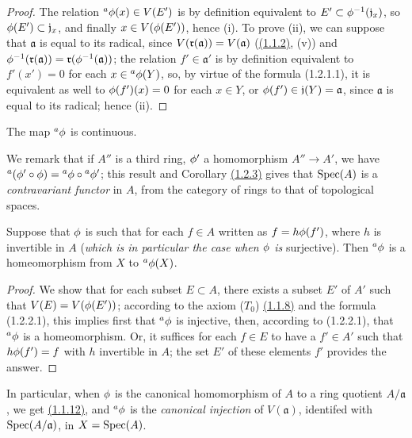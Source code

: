 \begin{proof}
\label{proof-prop-1.1.2.2}
The relation ${}^a\phi(x)\in V(E')$ is by definition equivalent to
$E'\subset\phi^{-1}(\mathfrak{j}_x)$, so $\phi(E')\subset\mathfrak{j}_x$, and
finally $x\in V(\phi(E'))$, hence (i). To prove (ii), we can suppose that
$\mathfrak{a}$ is equal to its radical, since $V(\mathfrak{r}(\mathfrak{a}))=V(\mathfrak{a})$
(\hyperref[prop-1.1.1.2]{(1.1.2)}, (v)) and
$\phi^{-1}(\mathfrak{r}(\mathfrak{a}))=\mathfrak{r}(\phi^{-1}(\mathfrak{a}))$; the relation
$f'\in\mathfrak{a}'$ is by definition equivalent to $f'(x')=0$ for each
$x\in{{}^a\phi(Y)}$, so, by virtue of the formula (1.2.1.1), it is equivalent as well
to $\phi(f')(x)=0$ for each $x\in Y$, or $\phi(f')\in\mathfrak{j}(Y)=\mathfrak{a}$,
since $\mathfrak{a}$ is equal to its radical; hence (ii).
\end{proof}

\begin{cor}[1.2.3]
\label{cor-1.1.2.3}
The map ${}^a\phi$ is continuous.
\end{cor}

We remark that if $A''$ is a third ring, $\phi'$ a homomorphism $A''\to A'$, we have
${}^a(\phi'\circ\phi)={}^a\phi\circ{}^a\phi'$; this result and Corollary
\hyperref[cor-1.1.2.3]{(1.2.3)} gives that ${\mathop{\mathrm{Spec}}\nolimits}(A)$ is a {\em contravariant functor} in $A$, from the
category of rings to that of topological spaces.

\begin{cor}[1.2.4]
\label{cor-1.1.2.4}
Suppose that $\phi$ is such that for each $f\in A$ written as $f=h\phi(f')$, where $h$ is
invertible in $A$ ({\em which is in particular the case when $\phi$ is} surjective). Then
${}^a\phi$ is a homeomorphism from $X$ to ${}^a\phi(X)$.
\end{cor}

\begin{proof}
\label{proof-cor-1.1.2.4}
We show that for each subset $E\subset A$, there exists a subset $E'$ of $A'$ such that
$V(E)=V(\phi(E'))$; according to the axiom ($T_0$) \hyperref[cor-1.1.1.8]{(1.1.8)} and the formula
(1.2.2.1), this implies first that ${}^a\phi$ is injective, then, according to (1.2.2.1),
that ${}^a\phi$ is a homeomorphism. Or, it suffices for each $f\in E$ to have a $f'\in A'$
such that $h\phi(f')=f$ with $h$ invertible in $A$; the set $E'$ of these elements $f'$
provides the answer.
\end{proof}

\begin{env}[1.2.5]
\label{env-1.1.2.5}
In particular, when $\phi$ is the canonical homomorphism of $A$ to a ring quotient
$A/\mathfrak{a}$, we get \hyperref[cor-1.1.1.12]{(1.1.12)}, and ${}^a\phi$ is the
{\em canonical injection} of $V(\mathfrak{a})$, identifed with ${\mathop{\mathrm{Spec}}\nolimits}(A/\mathfrak{a})$,
in $X={\mathop{\mathrm{Spec}}\nolimits}(A)$.
\end{env}

